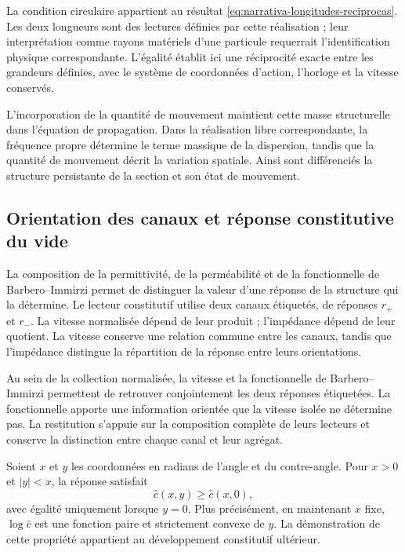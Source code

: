 La condition circulaire appartient au résultat
\eqref{eq:narrativa-longitudes-reciprocas}. Les deux longueurs sont des lectures
définies par cette réalisation ; leur interprétation comme rayons matériels
d’une particule requerrait l’identification physique correspondante.
L’égalité établit ici une réciprocité exacte entre les grandeurs
définies, avec le système de coordonnées d’action, l’horloge et la vitesse conservés.

L’incorporation de la quantité de mouvement maintient cette masse structurelle dans l’équation
de propagation. Dans la réalisation libre correspondante, la fréquence
propre détermine le terme massique de la dispersion, tandis que la quantité de mouvement
décrit la variation spatiale. Ainsi sont différenciés la structure
persistante de la section et son état de mouvement.

\subsection{Orientation des canaux et réponse constitutive du vide}
\label{subsec:narrativa-vacio-orientacion}

La composition de la permittivité, de la perméabilité et de la fonctionnelle de Barbero--Immirzi
permet de distinguer la valeur d’une réponse de la structure qui la
détermine. Le lecteur constitutif utilise deux canaux étiquetés, de
réponses $r_+$ et $r_-$. La vitesse normalisée dépend de leur produit ;
l’impédance dépend de leur quotient. La vitesse conserve une relation
commune entre les canaux, tandis que l’impédance distingue la répartition de la
réponse entre leurs orientations.

Au sein de la collection normalisée, la vitesse et la fonctionnelle de
Barbero--Immirzi permettent de retrouver conjointement les deux réponses
étiquetées. La fonctionnelle apporte une information orientée que la vitesse
isolée ne détermine pas. La restitution s’appuie sur la composition complète
de leurs lecteurs et conserve la distinction entre chaque canal et leur agrégat.

Soient $x$ et $y$ les coordonnées en radians de l’angle et du contre-angle.
Pour $x>0$ et $|y|<x$, la réponse satisfait
\begin{equation}
 \widehat c(x,y)\geq\widehat c(x,0),
 \label{eq:narrativa-convexidad-velocidad}
\end{equation}
avec égalité uniquement lorsque $y=0$. Plus précisément, en maintenant $x$
fixe, $\log\widehat c$ est une fonction paire et strictement convexe de $y$.
La démonstration de cette propriété appartient au développement constitutif
ultérieur.

